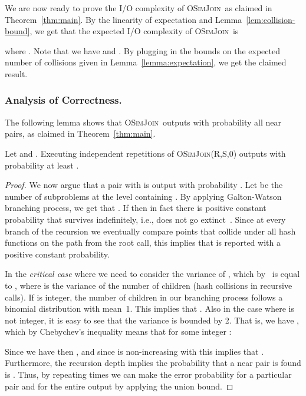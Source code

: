 \documentclass{llncs}
\newcommand{\SimJoin}{\textsc{OSimJoin}}
\begin{document}
We are now ready to prove the I/O complexity of \SimJoin\ as claimed in Theorem~\ref{thm:main}.
By the linearity of expectation and Lemma~\ref{lem:collision-bound}, we get that the expected I/O complexity of \SimJoin\ is

where . 
Note that  we have  and
. By plugging in the
bounds on the expected number of collisions given in Lemma~\ref{lemma:expectation}, we get the claimed result.



\subsubsection{Analysis of Correctness.}\label{sec:correctness}
The following lemma shows that \SimJoin\ outputs with probability 
all  near pairs,  as claimed in Theorem~\ref{thm:main}.
\begin{lemma}\label{lem:prob}
Let  and . Executing  independent 
repetitions of \SimJoin(R,S,0) outputs  with probability at least .
\end{lemma}
\begin{proof}
We now argue that a pair  with  is output with probability .
Let  be the number of subproblems at the level  containing .
By applying Galton-Watson branching process, we get that .
If  then in fact there is positive constant probability that  survives indefinitely, i.e., does not go extinct~\cite{harris2002theory}.
Since at every branch of the recursion we eventually compare points that collide under all hash functions on the path from the root call, this implies that  is reported with a positive constant probability.

In the \emph{critical case} where  we need to consider the variance of , which by~\cite[Theorem 5.1]{harris2002theory} is equal to , where  is the variance of the number of children (hash collisions in recursive calls).
If  is integer, the number of children in our branching process follows a binomial distribution with mean~1.
This implies that .
Also in the case where  is not integer, it is easy to see that the variance is bounded by 2. That is, we have , which by Chebychev's inequality means that for some integer :

Since we have  then , and since  is non-increasing with  this implies that .
Furthermore, the recursion depth  implies the probability that a near pair is found is .
Thus, by repeating  times we can make the error probability  for a particular pair and  for the entire output by applying the union bound.
\end{proof}
\end{document}
